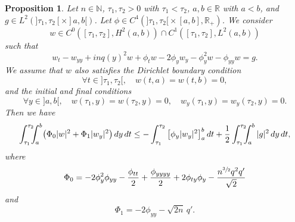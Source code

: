 \documentclass[JEP,XML,SOM,Unicode]{cedram}
\theoremstyle{plain}
\newtheorem{proposition}[theorem]{Proposition}
\theoremstyle{definition}
\newcommand{\abs}[1]{\vert #1\vert}
\newcommand{\1}{\mathds 1}
\newcommand{\R}{\mathbb{R}}
\newcommand{\N}{\mathbb{N}}
\begin{document}
\begin{proposition} \label{prop-Carleman}
Let $n \in \N$, $\tau_1,\tau_2 > 0$ with $\tau_1<\tau_2$, $a,b \in \R$ with $a < b$, and $g \in L^2 (]\tau_1,\tau_2[\times{}]a,b[)$. Let $\phi \in C^4(]\tau_1,\tau_2[{}\times [a,b],\R_+)$. We consider
\[
w \in C^0([\tau_1,\tau_2],H^2(a,b)) \cap C^1([\tau_1,\tau_2],L^2(a,b))
\]
such that
\begin{equation} \label{eq-w}
w_t - w_{yy} + inq(y)^2 w + \phi_t w - 2 \phi_y w_y - \phi_y^2 w - \phi_{yy} w = g.
\end{equation}
We assume that $w$ also satisfies the Dirichlet boundary condition
\begin{equation} \label{eq-w-Dir}
\forall t \in{}]\tau_1,\tau_2[, \quad w(t,a) = w(t,b) = 0,
\end{equation}
and the initial and final conditions
\begin{equation} \label{eq-w-0T}
\forall y \in{}]a,b[, \quad w(\tau_1,y) = w(\tau_2,y) = 0, \quad w_y(\tau_1,y) = w_y(\tau_2,y) = 0.
\end{equation}
Then we have
\begin{equation*}
\int_{\tau_1}^{\tau_2} \hspace*{-2mm}\int_a^b \bigl(\Phi_0 \abs w^2 + \Phi_1 \abs{w_y}^2 \bigr) \, dy \, dt
\leq - \int_{\tau_1}^{\tau_2} \big[ \phi_y \abs{w_y}^2 \big]_a^b \, dt + \frac 1 2 \int_{\tau_1}^{\tau_2}\hspace*{-2mm} \int_a^b \abs{g}^2 \, dy \, dt ,
\end{equation*}
where
\begin{equation} \label{def-Phi0}
\Phi_0 = - 2 \phi_y^2 \phi_{yy} - \frac {\phi_{tt}}{2} + \frac {\phi_{yyyy}}{2} + 2\phi_{ty} \phi_{y} - \frac {n^{\sfrac{3}{2}}q^2 q'}{\sqrt 2}
\end{equation}
and
\begin{equation} \label{def-Phi1}
\Phi_1 = - 2 \phi_{yy} - \sqrt {2n}\, q'.
\end{equation}
\end{proposition}
\end{document}
